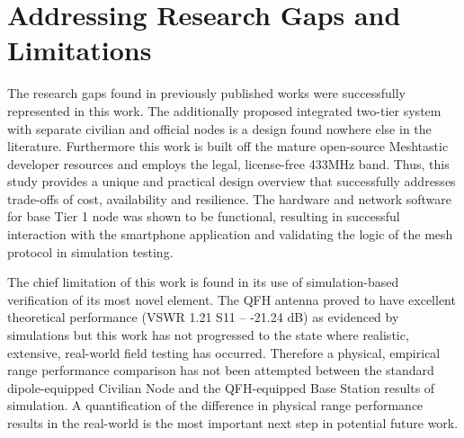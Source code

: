 \section{Addressing Research Gaps and Limitations}

The research gaps found in previously published works were successfully represented in this work. The additionally proposed integrated two-tier system with separate civilian and official nodes is a design found nowhere else in the literature. Furthermore this work is built off the mature open-source Meshtastic developer resources and employs the legal, license-free 433MHz band. Thus, this study provides a unique and practical design overview that successfully addresses trade-offs of cost, availability and resilience. The hardware and network software for base Tier 1 node was shown to be functional, resulting in successful interaction with the smartphone application and validating the logic of the mesh protocol in simulation testing. 

The chief limitation of this work is found in its use of simulation-based verification of its most novel element. The QFH antenna proved to have excellent theoretical performance (VSWR 1.21 S11 – -21.24 dB) as evidenced by simulations but this work has not progressed to the state where realistic, extensive, real-world field testing has occurred. Therefore a physical, empirical range performance comparison has not been attempted between the standard dipole-equipped Civilian Node and the QFH-equipped Base Station results of simulation. A quantification of the difference in physical range performance results in the real-world is the most important next step in potential future work.